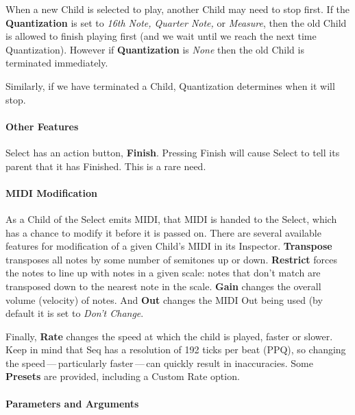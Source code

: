 \documentclass[twoside,10pt]{article}
\begin{document}
When a new Child is selected to play, another Child may need to stop first.   If the {\bf Quantization} is set to {\it 16th Note, Quarter Note,} or {\it Measure}, then the old Child is allowed to finish playing first (and we wait until we reach the next time Quantization).  However if {\bf Quantization} is {\it None} then the old Child is terminated immediately.

Similarly, if we have terminated a Child, Quantization determines when it will stop.

\paragraph{Other Features}

Select has an action button, {\bf Finish}.  Pressing Finish will cause Select to tell its parent that it has Finished.  This is a rare need.


\paragraph{MIDI Modification}

As a Child of the Select emits MIDI, that MIDI is handed to the Select, which has a chance to modify it before it is passed on.  There are several available features for modification of a given Child's MIDI in its Inspector.  {\bf Transpose} transposes all notes by some number of semitones up or down.  {\bf Restrict} forces the notes to line up with notes in a given scale: notes that don't match are transposed down to the nearest note in the scale.  {\bf Gain} changes the overall volume (velocity) of notes.  And {\bf Out} changes the MIDI Out being used (by default it is set to {\it Don't Change}.

Finally, {\bf Rate} changes the speed at which the child is played, faster or slower.  Keep in mind that Seq has a resolution of 192 ticks per beat (PPQ), so changing the speed\,---\,particularly faster\,---\,can quickly result in inaccuracies.    Some {\bf Presets} are provided, including a Custom Rate option.


\paragraph{Parameters and Arguments}
\end{document}
